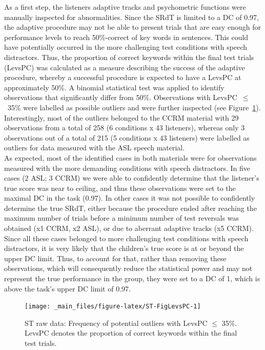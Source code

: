 \documentclass[a4paper, twoside]{templates/ociamthesis}
\begin{document}
As a first step, the listeners adaptive tracks and psychometric functions were manually inspected for abnormalities. Since the SRdT is limited to a DC of 0.97, the adaptive procedure may not be able to present trials that are easy enough for performance levels to reach 50\%-correct of key words in sentences. This could have potentially occurred in the more challenging test conditions with speech distractors. Thus, the proportion of correct keywords within the final test trials (LevsPC) was calculated as a measure describing the success of the adaptive procedure, whereby a successful procedure is expected to have a LevsPC at approximately 50\%. A binomial statistical test was applied to identify observations that significantly differ from 50\%. Observations with LevsPC~\(\leq\)~35\% were labelled as possible outliers and were further inspected (see Figure~\ref{fig:ST-FigLevsPC}). Interestingly, most of the outliers belonged to the CCRM material with 29 observations from a total of 258 (6 conditions x 43 listeners), whereas only 3 observations out of a total of 215 (5 conditions x 43 listeners) were labelled as outliers for data measured with the ASL speech material.\\

As expected, most of the identified cases in both materials were for observations measured with the more demanding conditions with speech distractors. In five cases (2 ASL; 3 CCRM) we were able to confidently determine that the listener's true score was near to ceiling, and thus these observations were set to the maximal DC in the task (0.97). In other cases it was not possible to confidently determine the true SRdT, either because the procedure ended after reaching the maximum number of trials before a minimum number of test reversals was obtained (x1 CCRM, x2 ASL), or due to aberrant adaptive tracks (x5 CCRM). Since all these cases belonged to more challenging test conditions with speech distractors, it is very likely that the children's true score is at or beyond the upper DC limit. Thus, to account for that, rather than removing these observations, which will consequently reduce the statistical power and may not represent the true performance in the group, they were set to a DC of 1, which is above the task's upper DC limit of 0.97.\\

\begin{figure}
\texttt{[image: \_main\_files/figure-latex/ST-FigLevsPC-1]} \caption{ST raw data: Frequency of potential outliers with LevsPC $\leq$ 35\%. LevsPC denotes the proportion of correct keywords within the final test trials.}\label{fig:ST-FigLevsPC}
\end{figure}
\end{document}
